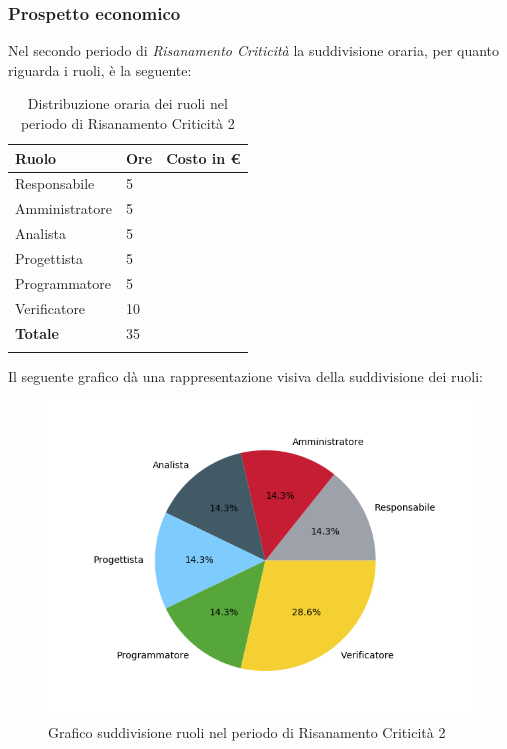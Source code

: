 \subsubsection{Prospetto economico}
Nel secondo periodo di \textit{Risanamento Criticità} la suddivisione oraria, per quanto riguarda i ruoli, è la seguente: 


\begin{longtable}{| C{.30\textwidth}| C{.15\textwidth}| C{.20\textwidth}|}
\hline
\textbf{Ruolo} & \textbf{Ore} & \textbf{Costo in \euro} \\
\hline 
Responsabile & 5 &  \\
\hline
Amministratore & 5 &  \\
\hline
Analista & 5 &  \\
\hline
Progettista & 5 & \\
\hline
Programmatore & 5 &  \\
\hline 
Verificatore & 10 &  \\
\hline
\textbf{Totale} & 35 &  \\
\hline 

\caption{Distribuzione oraria dei ruoli nel periodo di Risanamento Criticità 2}
\label{Distribuzione oraria rc2}
\end{longtable}

Il seguente grafico dà una rappresentazione visiva della suddivisione dei ruoli:
\begin{figure}[H]
	\centering
  		\includegraphics[width=1\linewidth]{./images/torta_rc2.png}
  		\caption{Grafico suddivisione ruoli nel periodo di Risanamento Criticità 2}
  		\label{fig:grafico suddivione ruoli rc2}
\end{figure}

